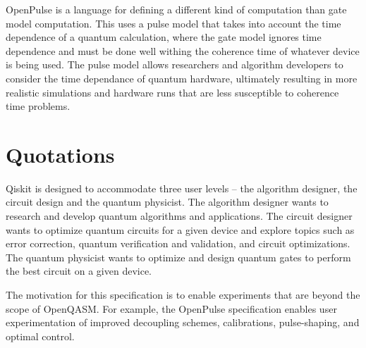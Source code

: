 \documentclass{article}
\begin{document}
OpenPulse is a language for defining a different kind of computation than gate model computation. This uses a pulse model that takes into account the time dependence of a quantum calculation, where the gate model ignores time dependence and must be done well withing the coherence time of whatever device is being used. The pulse model allows researchers and algorithm developers to consider the time dependance of quantum hardware, ultimately resulting in more realistic simulations and hardware runs that are less susceptible to coherence time problems.

\section{Quotations}

Qiskit is designed to accommodate three user levels -- the algorithm designer, the circuit design and the quantum physicist. The algorithm designer wants to research and develop quantum algorithms and applications. The circuit designer wants to optimize quantum circuits for a given device and explore topics such as error correction, quantum verification and validation, and circuit optimizations. The quantum physicist wants to optimize and design quantum gates to perform the best circuit on a given device.

The motivation for this specification is to enable experiments that are beyond the scope of OpenQASM. For example, the OpenPulse specification enables user experimentation of improved decoupling schemes, calibrations, pulse-shaping, and optimal control.
\end{document}
